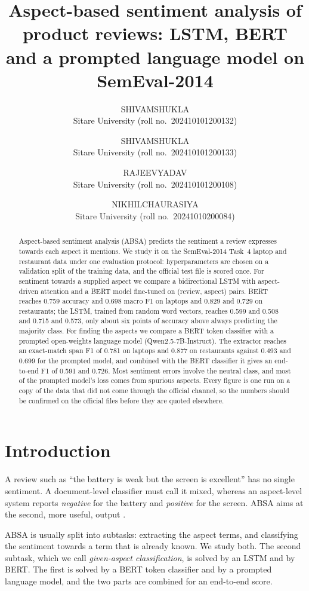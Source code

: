 \documentclass{nle}
\title[Aspect-based sentiment analysis of product reviews]{Aspect-based sentiment analysis of product reviews: LSTM, BERT and a prompted language model on SemEval-2014}
\author[S. Shukla and others]
       {S\ls H\ls I\ls V\ls A\ls M\ns S\ls H\ls U\ls K\ls L\ls A\\
        Sitare University (roll no.\ 202410101200132)
        \and
        S\ls H\ls I\ls V\ls A\ls M\ns S\ls H\ls U\ls K\ls L\ls A\\
        Sitare University (roll no.\ 202410101200133)
        \and
        R\ls A\ls J\ls E\ls E\ls V\ns Y\ls A\ls D\ls A\ls V\\
        Sitare University (roll no.\ 202410101200108)
        \and
        N\ls I\ls K\ls H\ls I\ls L\ns C\ls H\ls A\ls U\ls R\ls A\ls S\ls I\ls Y\ls A\\
        Sitare University (roll no.\ 20241010200084)}
\begin{document}
\label{firstpage}
\maketitle

\begin{abstract}
Aspect-based sentiment analysis (ABSA) predicts the sentiment a review expresses towards each aspect it mentions. We study it on the SemEval-2014 Task~4 laptop and restaurant data under one evaluation protocol: hyperparameters are chosen on a validation split of the training data, and the official test file is scored once. For sentiment towards a supplied aspect we compare a bidirectional LSTM with aspect-driven attention and a BERT model fine-tuned on (review, aspect) pairs. BERT reaches 0.759 accuracy and 0.698 macro F1 on laptops and 0.829 and 0.729 on restaurants; the LSTM, trained from random word vectors, reaches 0.599 and 0.508 and 0.715 and 0.573, only about six points of accuracy above always predicting the majority class. For finding the aspects we compare a BERT token classifier with a prompted open-weights language model (Qwen2.5-7B-Instruct). The extractor reaches an exact-match span F1 of 0.781 on laptops and 0.877 on restaurants against 0.493 and 0.699 for the prompted model, and combined with the BERT classifier it gives an end-to-end F1 of 0.591 and 0.726. Most sentiment errors involve the neutral class, and most of the prompted model's loss comes from spurious aspects. Every figure is one run on a copy of the data that did not come through the official channel, so the numbers should be confirmed on the official files before they are quoted elsewhere.
\end{abstract}

\section{Introduction}

A review such as ``the battery is weak but the screen is excellent'' has no single sentiment. A document-level classifier must call it mixed, whereas an aspect-level system reports \textit{negative} for the battery and \textit{positive} for the screen. ABSA aims at the second, more useful, output \cite{pontiki2014}.

ABSA is usually split into subtasks: extracting the aspect terms, and classifying the sentiment towards a term that is already known. We study both. The second subtask, which we call \textit{given-aspect classification}, is solved by an LSTM and by BERT. The first is solved by a BERT token classifier and by a prompted language model, and the two parts are combined for an end-to-end score.
\end{document}
